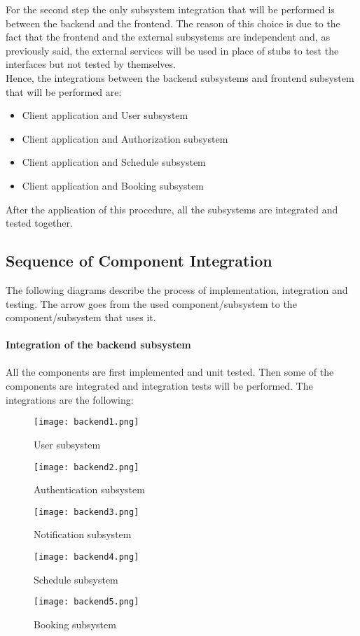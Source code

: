 For the second step the only subsystem integration that will be performed is between the backend and the frontend. The reason of this choice is due to the fact that the frontend and the external subsystems are independent and, as previously said, the external services will be used in place of stubs to test the interfaces but not tested by themselves.\\
Hence, the integrations between the backend subsystems and frontend subsystem that will be performed are:
\begin{itemize}
	\item Client application and User subsystem
	\item Client application and Authorization subsystem
	\item Client application and Schedule subsystem
	\item Client application and Booking subsystem
\end{itemize}
After the application of this procedure, all the subsystems are integrated and tested together.

\subsection{Sequence of Component Integration}
The following diagrams describe the process of implementation, integration and testing. The arrow goes from the used component/subsystem to the component/subsystem that uses it.
\\ \\
\noindent
\textbf{Integration of the backend subsystem}\\ \\
All the components are first implemented and unit tested. Then some of the components are integrated and integration tests will be performed. The integrations are the following:
\begin{figure}[h!]
	\centering
	\texttt{[image: backend1.png]}
	\caption{User subsystem}
\end{figure}
\begin{figure}[h!]
	\centering
	\texttt{[image: backend2.png]}
	\caption{Authentication subsystem}
\end{figure}
\begin{figure}[h!]
	\centering
	\texttt{[image: backend3.png]}
	\caption{Notification subsystem}
\end{figure}
\newpage
\begin{figure}[h!]
	\centering
	\texttt{[image: backend4.png]}
	\caption{Schedule subsystem}
\end{figure}
\begin{figure}[h!]
	\centering
	\texttt{[image: backend5.png]}
	\caption{Booking subsystem}
\end{figure}


